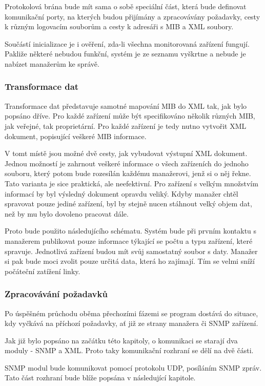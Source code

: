 Protokolová brána bude mít sama o sobě speciální část, která bude definovat komunikační porty, na kterých budou přijímány a zpracovávány požadavky, cesty k různým logovacím souborům a cesty k adresáři s MIB a XML soubory.

Součástí inicializace je i ověření, zda-li všechna monitorovaná zařízení fungují. Pakliže některé nebudou funkční, systém je ze seznamu vyškrtne a nebude je nabízet manažerům ke správě.

\subsubsection{Transformace dat}
Transformace dat představuje samotné mapování MIB do XML tak, jak bylo popsáno dříve. Pro každé zařízení může být specifikováno několik různých MIB, jak veřejné, tak proprietární. Pro každé
zařízení je tedy nutno vytvořit XML dokument, popisující veškeré MIB informace.

V tomt místě jsou možné dvě cesty, jak vybudovat výstupní XML dokument. Jednou možností je zahrnout veškeré informace o všech zařízeních do jednoho souboru, který potom bude rozesílán každému manažerovi, jenž si o něj řekne. Tato varianta
je sice praktická, ale neefektivní. Pro zařízení s velkým množstvím informací by byl výsledný dokument opravdu veliký. Kdyby manažer chtěl spravovat pouze jediné zařízení, byl by stejně nucen stáhnout velký objem dat, než
by mu bylo dovoleno pracovat dále.

Proto bude použito následujícího schématu. Systém bude při prvním kontaktu s manažerem publikovat pouze informace týkající se počtu a typu zařízení, které spravuje. Jednotlivá zařízení budou mít svůj samostatný soubor
s daty. Manažer si pak bude moci zvolit pouze určitá data, která ho zajímají. Tím se velmi sníží počáteční zatížení linky.

\subsubsection{Zpracovávání požadavků}
Po úspěšném průchodu oběma přechozími fázemi se program dostává do situace, kdy vyčkává na příchozí požadavky, ať již ze strany manažera či SNMP zařízení.

Jak již bylo popsáno na začátku této kapitoly, o komunikaci se starají dva moduly - SNMP a XML. Proto taky komunikační rozhraní se dělí na dvě části.

SNMP modul bude komunikovat pomocí protokolu UDP, posíláním SNMP zpráv. Tato část rozhraní bude blíže popsána v následující kapitole.

